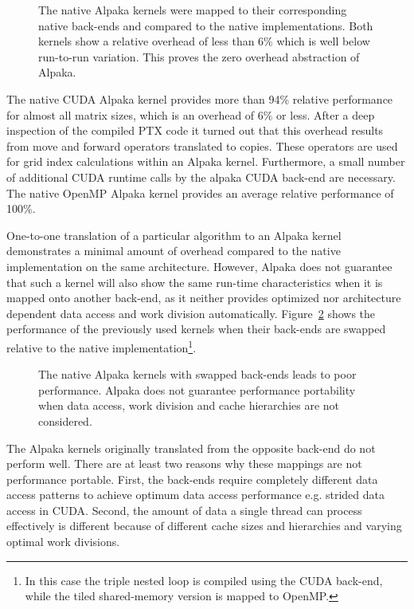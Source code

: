\documentclass[10pt, twocolumn]{article}
\newcommand{\alpaka}{Alpaka\xspace}
\newcommand{\cuda}{{CUDA}\xspace}
\newcommand{\openmp}{{OpenMP}\xspace}
\begin{document}
\begin{figure}[tb]
  \centerline
      {}
      \caption{The native \alpaka kernels were mapped to their corresponding native back-ends and compared to the native implementations.
        Both kernels show a relative overhead of less than 6\% which is well below run-to-run variation. This proves the zero overhead abstraction of \alpaka.}
  \label{fig:performance_overhead}
\end{figure}

The native \cuda \alpaka kernel provides more than 94\% relative performance for almost all matrix sizes, which is an overhead of 6\% or less.
After a deep inspection of the compiled PTX code it turned out that this overhead results from move and forward operators translated to copies.
These operators are used for grid index calculations within an \alpaka kernel.
Furthermore, a small number of additional \cuda runtime calls by the alpaka \cuda back-end are necessary.
The native \openmp \alpaka kernel provides an average relative performance of 100\%.

One-to-one translation of a particular algorithm to an \alpaka kernel demonstrates a minimal amount of overhead compared to the native implementation on the same architecture.
However, \alpaka does not guarantee that such a kernel will also show the same run-time characteristics when it is mapped onto another back-end, as it neither provides optimized nor architecture dependent data access and work division automatically.
Figure~\ref{fig:performance_overhead_bad} shows the performance of the previously used kernels when their back-ends are swapped relative to the native implementation\footnote{In this case the triple nested loop is compiled using the CUDA back-end, while the tiled shared-memory version is mapped to OpenMP.}.

\begin{figure}[tb]
  \centerline
      {}
      \caption{The native \alpaka kernels with swapped back-ends leads to poor performance.
        \alpaka does not guarantee performance portability when data access, work division and cache hierarchies are not considered.}
  \label{fig:performance_overhead_bad}
\end{figure}

The \alpaka kernels originally translated from the opposite back-end do not perform well.
There are at least two reasons why these mappings are not performance portable.
First, the back-ends require completely different data access patterns to achieve optimum data access performance e.g. strided data access in \cuda.
Second, the amount of data a single thread can process effectively is different because of different cache sizes and hierarchies and varying optimal work divisions.
\end{document}
